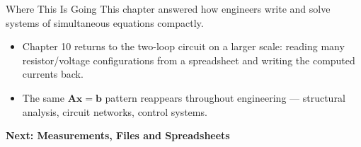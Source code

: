 \documentclass[9pt,aspectratio=169,xcolor=table]{beamer}
\begin{document}
\begin{frame}{Where This Is Going}
    \leavevmode
    \small
    This chapter answered how engineers write and solve systems of
    simultaneous equations compactly.

    \vspace{3mm}
    \begin{itemize}
        \item Chapter 10 returns to the two-loop circuit on a larger
              scale: reading many resistor/voltage configurations from
              a spreadsheet and writing the computed currents back.
        \item The same $\mathbf{A}\mathbf{x} = \mathbf{b}$ pattern
              reappears throughout engineering --- structural analysis,
              circuit networks, control systems.
    \end{itemize}

    \vspace{4mm}
    \begin{center}
        \large\color{primary}\textbf{Next: Measurements, Files and Spreadsheets}
    \end{center}
\end{frame}
\end{document}
